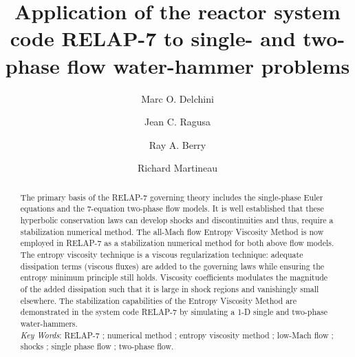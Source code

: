 \documentclass{mc2015}
\begin{document}
\title{Application of the reactor system code RELAP-7 to single- and two-phase flow water-hammer problems}

\author{Marc O. Delchini}
\author{Jean C. Ragusa}

\author{Ray A. Berry}
\author{Richard Martineau}

\maketitle

\begin{abstract}
The primary basis of the RELAP-7 governing theory includes the single-phase Euler equations and the 7-equation two-phase flow models. 
It is well established that these hyperbolic conservation laws can develop shocks and discontinuities and thus, require a stabilization 
numerical method. The all-Mach flow Entropy Viscosity Method is now employed in RELAP-7 as a stabilization numerical method for both 
above flow models. The entropy viscosity technique is a viscous regularization technique: adequate dissipation terms (viscous fluxes) are 
added to the governing laws while ensuring the entropy minimum principle still holds. Viscosity coefficients modulates the magnitude of the 
added dissipation such that it is large in shock regions and vanishingly small elsewhere. The stabilization capabilities of the Entropy Viscosity 
Method are demonstrated in the system code RELAP-7 by simulating a 1-D single and two-phase water-hammers. \\
%
\emph{Key Words}:  RELAP-7 ; numerical method ; entropy viscosity method ; low-Mach flow ; shocks ; single phase flow ; two-phase flow.
\end{abstract}

\end{document}
